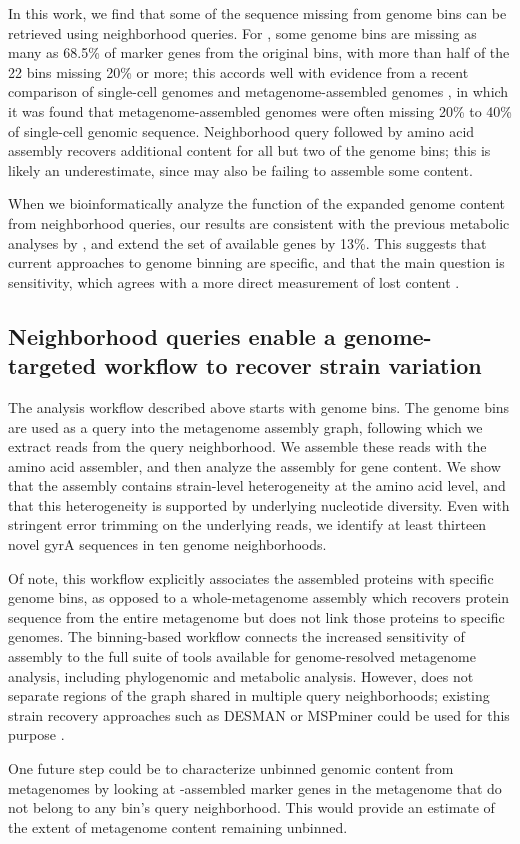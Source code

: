 In this work, we find that some of the sequence missing from genome
bins can be retrieved using neighborhood queries.  For \hu, some
genome bins are missing as many as 68.5\% of marker genes from the
original bins, with more than half of the 22 bins missing 20\% or
more; this accords well with evidence from a recent comparison of
single-cell genomes and metagenome-assembled genomes \cite{baltic}, in
which it was found that metagenome-assembled genomes were often
missing 20\% to 40\% of single-cell genomic sequence.  Neighborhood
query followed by amino acid assembly recovers additional content for
all but two of the genome bins; this is likely an underestimate, since
\plass may also be failing to assemble some content.

When we bioinformatically analyze the
function of the expanded genome content from neighborhood queries, our
results are consistent with the previous metabolic analyses by \cite{Hu2016}, and extend the
set of available genes by 13\%.
This suggests that current approaches to genome binning are specific,
and that the main question is sensitivity, which agrees with a more direct
measurement of lost content \cite{baltic}.

\subsection*{Neighborhood queries enable a genome-targeted workflow to recover strain variation}

The \sgc analysis workflow described above starts with genome bins. The
genome bins are used as a query into the metagenome assembly graph,
following which we extract reads from the query neighborhood.  We
assemble these reads with the \plass amino acid assembler, and then
analyze the assembly for gene content. We show that the \plass
assembly contains strain-level heterogeneity at the amino acid level,
and that this heterogeneity is supported by underlying nucleotide
diversity.  Even with stringent error trimming on the underlying
reads, we identify at least thirteen novel gyrA sequences in ten
genome neighborhoods.

Of note, this workflow explicitly associates the \plass assembled
proteins with specific genome bins, as opposed to a whole-metagenome
\plass assembly which recovers protein sequence from the entire
metagenome but does not link those proteins to specific genomes. The
binning-based workflow connects the increased sensitivity of \plass
assembly to the full suite of tools available for genome-resolved
metagenome analysis, including phylogenomic and metabolic
analysis. However, \sgc does not separate regions of the graph shared
in multiple query neighborhoods; existing
strain recovery approaches such as DESMAN or MSPminer could be used for this purpose
\cite{desman,mspminer}.

One future step could be to characterize unbinned genomic
content from metagenomes by looking at \plass-assembled marker genes
in the metagenome that do not belong to any bin's query neighborhood.
This would provide an estimate of the extent of
metagenome content remaining unbinned.
